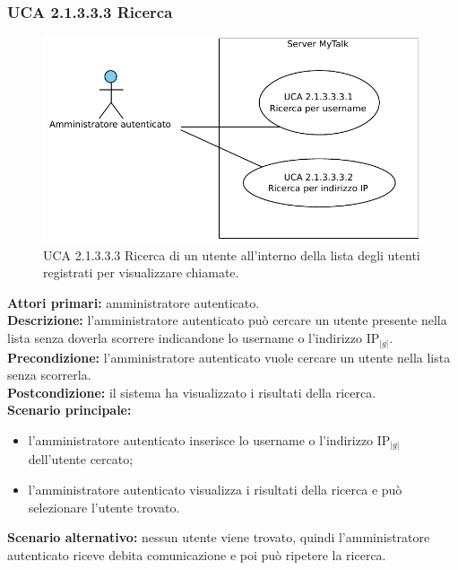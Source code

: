 \subsubsection{UCA 2.1.3.3.3 Ricerca}

\begin{figure}[htbp]
\centering
\includegraphics[scale=0.7]{./casi_uso/UCA2-1-3-3-3.pdf}
\caption{UCA 2.1.3.3.3 Ricerca di un utente all'interno della lista degli utenti registrati per visualizzare chiamate.}
\end{figure}

\noindent
\textbf{Attori primari:} amministratore autenticato.\\
\textbf{Descrizione:} l'amministratore autenticato può cercare un utente presente nella lista senza doverla scorrere indicandone lo username o l'indirizzo IP$_{|g|}$.\\
\textbf{Precondizione:} l'amministratore autenticato vuole cercare un utente nella lista senza scorrerla.\\
\textbf{Postcondizione:} il sistema ha visualizzato i risultati della ricerca.\\
\textbf{Scenario principale:}
\begin{itemize}
\item l'amministratore autenticato inserisce lo username o l'indirizzo IP$_{|g|}$ dell'utente cercato;
\item l'amministratore autenticato visualizza i risultati della ricerca e può selezionare l'utente trovato.
\end{itemize}
\textbf{Scenario alternativo:} nessun utente viene trovato, quindi l'amministratore autenticato riceve debita comunicazione e poi può ripetere la ricerca.

